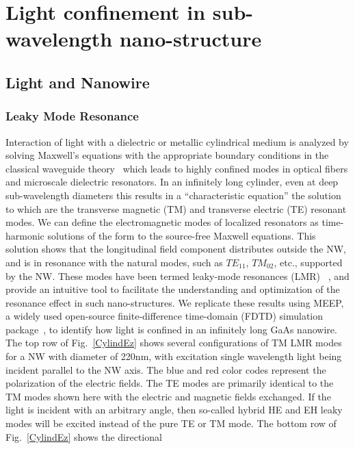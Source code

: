 \chapter{Light confinement in sub-wavelength nano-structure} \label{LM}


\section{Light and Nanowire} \label{LightNW}


\subsection{Leaky Mode Resonance}
\label{sec:LMR}

Interaction of light with a dielectric or metallic cylindrical medium is
analyzed by solving Maxwell's equations with the appropriate boundary
conditions in the classical waveguide theory~\cite{Kapany:tq} which leads to
highly confined modes in optical fibers and microscale dielectric resonators.
In an infinitely long cylinder, even at deep sub-wavelength diameters this
results in a “characteristic equation” the solution to which are the transverse
magnetic (TM) and transverse electric (TE) resonant modes. We can define the
electromagnetic modes of localized resonators as time-harmonic solutions of the
form to the source-free Maxwell equations. This solution shows that the
longitudinal field component distributes outside the NW, and is in resonance
with the natural modes, such as ${TE}_{11}$, ${TM}_{02}$, etc., supported by
the NW. These modes have been termed leaky-mode resonances
(LMR)~\cite{Cao:2009ho,Fountaine:2014de} , and provide an intuitive tool to
facilitate the understanding and optimization of the resonance effect in such
nano-structures.  We replicate these results using MEEP, a widely used
open-source finite-difference time-domain (FDTD) simulation
package~\cite{Oskooi:2010fb}, to identify how light is confined in an
infinitely long GaAs nanowire. The top row of Fig.~\ref{CylindEz} shows several
configurations of TM LMR modes for a NW with diameter of 220nm, with excitation
single wavelength light being incident parallel to the NW axis. The blue and
red color codes represent the polarization of the electric fields. The TE modes
are primarily identical to the TM modes shown here with the electric and
magnetic fields exchanged. If the light is incident with an arbitrary angle,
then so-called hybrid HE and EH leaky modes will be excited instead of the pure
TE or TM mode. The bottom row of Fig.~\ref{CylindEz} shows the directional
